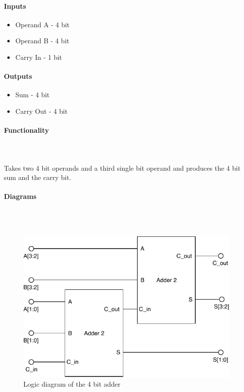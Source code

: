 \documentclass{article}
\begin{document}
    \paragraph{Inputs}
    \begin{itemize}
        \item Operand A - 4 bit
        \item Operand B - 4 bit
        \item Carry In - 1 bit
    \end{itemize}

    \paragraph{Outputs}
    \begin{itemize}
        \item Sum - 4 bit
        \item Carry Out - 4 bit
    \end{itemize}

    \paragraph{Functionality}
    \hfill\\\\
    Takes two 4 bit operands and a third single bit operand and produces the
    4 bit sum and the carry bit.

    \paragraph{Diagrams}
    \hfill\\\\
    \begin{figure}[H]
        \centering
        \includegraphics{../diagrams/alu/adder/adder_4.pdf}
        \caption{Logic diagram of the 4 bit adder}
    \end{figure}
\end{document}
